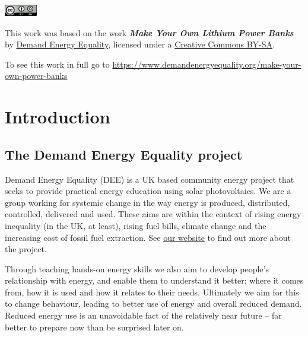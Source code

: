 \documentclass{article}
\theoremstyle{definition}
\theoremstyle{definition}
\theoremstyle{remark}
\begin{document}
    \includegraphics[]{../Images/image_0_2_(license).png} \newline

    This work was based on the work \textbf{\textit{Make Your Own Lithium Power Banks}} by \href{https://www.demandenergyequality.org/}{Demand Energy Equality}, licensed under a \href{https://creativecommons.org/licenses/by-sa/4.0/legalcode}{Creative Commons BY-SA}.

    To see this work in full go to \href{https://www.demandenergyequality.org/make-your-own-power-banks}{https://www.demandenergyequality.org/make-your-own-power-banks}
  


\newpage

\section{Introduction} %
\label{sec:introduction}

  \subsection{The Demand Energy Equality project} %
  \label{sub:the_demand_energy_equality_project}

    Demand Energy Equality (DEE) is a UK based community energy project that seeks to provide practical energy education using solar photovoltaics. We are a group working for systemic change in the way energy is produced, distributed, controlled, delivered and used. These aims are within the context of rising energy inequality (in the UK, at least), rising fuel bills, climate change and the increasing cost of fossil fuel extraction. See \href{https://www.demandenergyequality.org/about/}{our website} to find out more about the project.
    
    Through teaching hands-on energy skills we also aim to develop people’s relationship with energy, and enable them to understand it better; where it comes from, how it is used and how it relates to their needs. Ultimately we aim for this to change behaviour, leading to better use of energy and overall reduced demand. Reduced energy use is an unavoidable fact of the relatively near future – far better to prepare now than be surprised later on.
  
\end{document}

